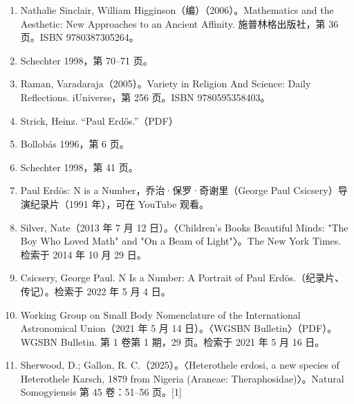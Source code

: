 \begin{enumerate}
\item Nathalie Sinclair, William Higginson（编）（2006）。Mathematics and the Aesthetic: New Approaches to an Ancient Affinity. 施普林格出版社，第 36 页。ISBN 9780387305264。
\item Schechter 1998，第 70–71 页。
\item Raman, Varadaraja（2005）。Variety in Religion And Science: Daily Reflections. iUniverse，第 256 页。ISBN 9780595358403。
\item Strick, Heinz. “Paul Erdős.”（PDF）
\item Bollobás 1996，第 6 页。
\item Schechter 1998，第 41 页。
\item Paul Erdös: N is a Number，乔治·保罗·奇谢里（George Paul Csicsery）导演纪录片（1991 年），可在 YouTube 观看。
\item Silver, Nate（2013 年 7 月 12 日）。〈Children’s Books Beautiful Minds: "The Boy Who Loved Math" and "On a Beam of Light"〉。The New York Times. 检索于 2014 年 10 月 29 日。
\item Csicsery, George Paul. N Is a Number: A Portrait of Paul Erdös.（纪录片、传记）。检索于 2022 年 5 月 4 日。
\item Working Group on Small Body Nomenclature of the International Astronomical Union（2021 年 5 月 14 日）。〈WGSBN Bulletin〉（PDF）。WGSBN Bulletin. 第 1 卷第 1 期，29 页。检索于 2021 年 5 月 16 日。
\item Sherwood, D.; Gallon, R. C.（2025）。〈Heterothele erdosi, a new species of Heterothele Karsch, 1879 from Nigeria (Araneae: Theraphosidae)〉。Natural Somogyiensis 第 45 卷：51–56 页。[1]
\end{enumerate}